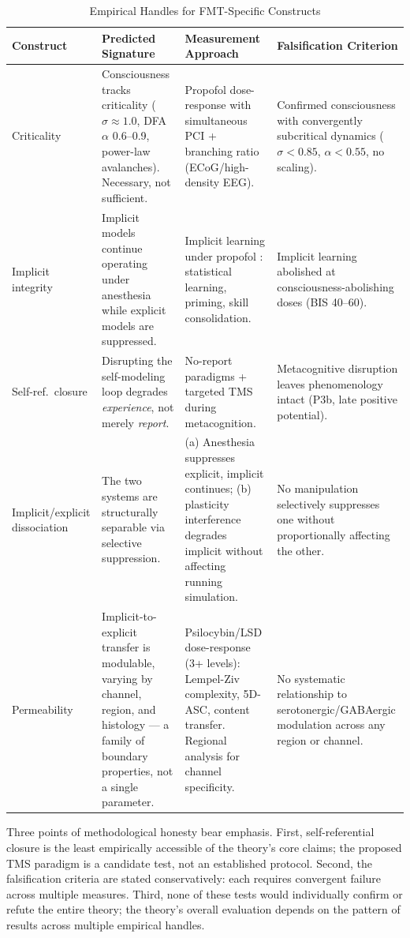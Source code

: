 \documentclass[12pt]{article}
\newcommand{\revend}{}
\begin{document}
{\begin{table}[H]
\caption{Empirical Handles for FMT-Specific Constructs}
\label{tab:empirical-handles}
\centering
\footnotesize
\begin{tabularx}{\textwidth}{p{2.5cm}XXX}
\toprule
\textbf{Construct} & \textbf{Predicted Signature} & \textbf{Measurement Approach} & \textbf{Falsification Criterion} \\
\midrule
Criticality & Consciousness tracks criticality ($\sigma \approx 1.0$, DFA $\alpha$ 0.6--0.9, power-law avalanches). Necessary, not sufficient. & Propofol dose-response with simultaneous PCI + branching ratio (ECoG/high-density EEG). & Confirmed consciousness with convergently subcritical dynamics ($\sigma < 0.85$, $\alpha < 0.55$, no scaling). \\
\midrule
Implicit integrity & Implicit models continue operating under anesthesia while explicit models are suppressed. & Implicit learning under propofol \citep{Katlowitz2026}: statistical learning, priming, skill consolidation. & Implicit learning abolished at consciousness-abolishing doses (BIS 40--60). \\
\midrule
Self-ref.\ closure & Disrupting the self-modeling loop degrades \emph{experience}, not merely \emph{report}. & No-report paradigms \citep{Tsuchiya2015} + targeted TMS during metacognition. & Metacognitive disruption leaves phenomenology intact (P3b, late positive potential). \\
\midrule
Implicit/explicit dissociation & The two systems are structurally separable via selective suppression. & (a) Anesthesia suppresses explicit, implicit continues; (b) plasticity interference degrades implicit without affecting running simulation. & No manipulation selectively suppresses one without proportionally affecting the other. \\
\midrule
Permeability & Implicit-to-explicit transfer is modulable, varying by channel, region, and histology --- a family of boundary properties, not a single parameter. & Psilocybin/LSD dose-response (3+ levels): Lempel-Ziv complexity, 5D-ASC, content transfer. Regional analysis for channel specificity. & No systematic relationship to serotonergic/GABAergic modulation across any region or channel. \\
\bottomrule
\end{tabularx}
\end{table}

Three points of methodological honesty bear emphasis. First, self-referential closure is the least empirically accessible of the theory's core claims; the proposed TMS paradigm is a candidate test, not an established protocol. Second, the falsification criteria are stated conservatively: each requires convergent failure across multiple measures. Third, none of these tests would individually confirm or refute the entire theory; the theory's overall evaluation depends on the pattern of results across multiple empirical handles.\revend}
\end{document}

